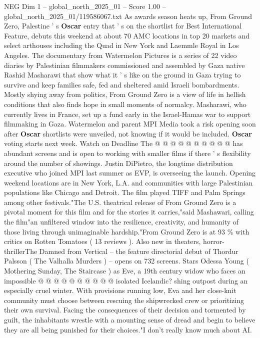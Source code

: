 \begin{textsample}{NEG Dim 1 – global\_north\_2025\_01 – Score 1.00 – global\_north\_2025\_01/119586067.txt}  \label{ex:f1_neg_062}
As awards season heats up, From Ground Zero, Palestine ' s \textbf{Oscar} entry that ' s on the shortlist for Best International Feature, debuts this weekend at about 70 AMC locations in top 20 markets and select arthouses including the Quad in New York and Laemmle Royal in Los Angeles.
The documentary from Watermelon Pictures is a series of 22 video diaries by Palestinian filmmakers commissioned and assembled by Gaza native Rashid Masharawi that show what it ' s like on the ground in Gaza trying to survive and keep families safe, fed and sheltered amid Israeli bombardments.
Mostly shying away from politics, From Ground Zero is a view of life in hellish conditions that also finds hope in small moments of normalcy.
Masharawi, who currently lives in France, set up a fund early in the Israel-Hamas war to support filmmaking in Gaza.
Watermelon and parent MPI Media took a risk opening soon after \textbf{Oscar} shortlists were unveiled, not knowing if it would be included. \textbf{Oscar} voting starts next week.
Watch on Deadline The @ @ @ @ @ @ @ @ @ @ has abundant screens and is open to working with smaller films if there ' s flexibility around the number of showings.
Justin DiPietro, the longtime distribution executive who joined MPI last summer as EVP, is overseeing the launch.
Opening weekend locations are in New York, L.A. and communities with large Palestinian populations like Chicago and Detroit.
The film played TIFF and Palm Springs among other festivals."The U.S. theatrical release of From Ground Zero is a pivotal moment for this film and for the stories it carries,"said Mashawari, calling the film"an unfiltered window into the resilience, creativity, and humanity of those living through unimaginable hardship."From Ground Zero is at 93 \% with critics on Rotten Tomatoes ( 13 reviews ).
Also new in theaters, horror-thrillerThe Damned from Vertical -- the feature directorial debut of Thordur Palsson ( The Valhalla Murders ) -- opens on 732 screens.
Stars Odessa Young ( Mothering Sunday, The Staircase ) as Eve, a 19th century widow who faces an impossible @ @ @ @ @ @ @ @ @ @ isolated Icelandic? shing outpost during an especially cruel winter.
With provisions running low, Eva and her close-knit community must choose between rescuing the shipwrecked crew or prioritizing their own survival.
Facing the consequences of their decision and tormented by guilt, the inhabitants wrestle with a mounting sense of dread and begin to believe they are all being punished for their choices."I don't really know much about AI.

\end{textsample}
